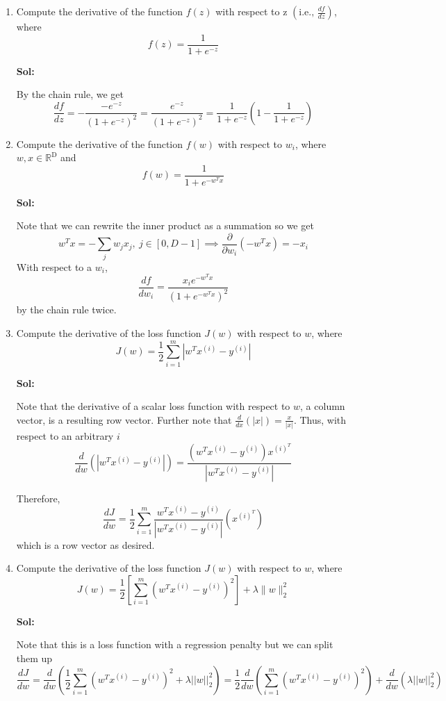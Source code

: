 \documentclass[11pt]{article}
\begin{document}
\begin{enumerate}
\item Compute the derivative of the function $f(z)$ with respect to z $\left(\text{i.e., }\frac{df}{dz}\right)$, where $$f(z) = \frac{1}{1+e^{-z}}$$

\textbf{Sol:}

  By the chain rule, we get 
  \[\frac{df}{dz} = -\dfrac{-e^{-z}}{(1 + e^{-z})^2} = \dfrac{e^{-z}}{(1+e^{-z})^2} = \frac{1}{1+e^{-z}}(1 - \frac{1}{1+e^{-z}})\]
  
  \newpage

\item Compute the derivative of the function $f(w)$ with respect to $w_i$, where $w, x \in \mathbb{R}^\text{D}$ and 
\[f(w) = \frac{1}{1+e^{-w^T x}}\]

\textbf{Sol:}

Note that we can rewrite the inner product as a summation so we get 
\[w^T x = -\sum_j w_j x_j, \ j \in [0, D-1] \implies \frac{\partial}{\partial w_i}(-w^T x) = -x_i\]
With respect to a $w_i$,
\[\frac{df}{dw_i} = \dfrac{x_i e^{-w^T x}}{(1+e^{-w^T x})^2}\]
by the chain rule twice.
  
  \newpage

\item Compute the derivative of the loss function $J(w)$ with respect to $w$, where 
\[J(w) = \frac{1}{2}\sum_{i=1}^{m} \left|w^{T}x^{(i)} - y^{(i)}\right|\]

\textbf{Sol:}

  Note that the derivative of a scalar loss function with respect to $w$, a column vector, is a resulting
  row vector. Further note that $\frac{d}{dx}(|x|) = \frac{x}{|x|}$. Thus, with respect to an arbitrary $i$
  \[\frac{d}{dw}(|w^T x^{(i)} - y^{(i)}|) = \dfrac{(w^T x^{(i)} - y^{(i)})x^{(i)^T}}{|w^T x^{(i)} - y^{(i)}|}\]
  
  Therefore, 
  \[\frac{dJ}{dw} = \frac{1}{2}\sum_{i=1}^m  \dfrac{w^T x^{(i)} - y^{(i)}}{|w^T x^{(i)} - y^{(i)}|}(x^{(i)^T})\]
  which is a row vector as desired.

  \newpage

\item Compute the derivative of the loss function $J(w)$ with respect to $w$, where 
\[J(w) = \frac{1}{2}\left[ \sum_{i=1}^{m} \left(w^{T}x^{(i)} - y^{(i)}\right)^2 \right] + \lambda \|w\|^2_2\] 

\textbf{Sol:}
  
Note that this is a loss function with a regression penalty but we can split them up
  \[\frac{dJ}{dw} = \frac{d}{dw}(\frac{1}{2}\sum_{i=1}^m (w^T x^{(i)} - y^{(i)})^2 + \lambda ||w||_2^2) = \frac{1}{2}\frac{d}{dw}(\sum_{i=1}^m (w^T x^{(i)} - y^{(i)})^2) + \frac{d}{dw}(\lambda ||w||^2_2)\]


\end{enumerate}
\end{document}
